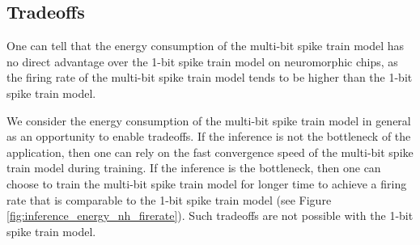     \subsection{Tradeoffs}
        One can tell that the energy consumption of the multi-bit spike train model has no direct advantage over the 1-bit spike train model on neuromorphic chips, as the firing rate of the multi-bit spike train model tends to be higher than the 1-bit spike train model. 

        We consider the energy consumption of the multi-bit spike train model in general as an opportunity to enable tradeoffs. If the inference is not the bottleneck of the application, then one can rely on the fast convergence speed of the multi-bit spike train model during training. If the inference is the bottleneck, then one can choose to train the multi-bit spike train model for longer time to achieve a firing rate that is comparable to the 1-bit spike train model (see Figure \ref{fig:inference_energy_nh_firerate}). Such tradeoffs are not possible with the 1-bit spike train model. 
